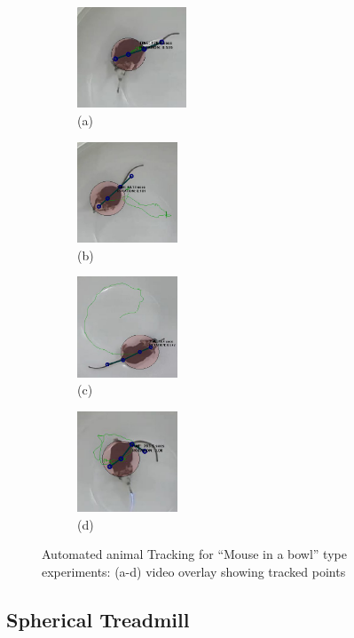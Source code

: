 \begin{figure}[htb]
	\begin{subfigure}[t]{0.24\linewidth}\centering
		\includegraphics[height=3cm]{figures/07mousedata1close.jpg}
		\caption{(a)}
	\end{subfigure}
	\hfill
	\begin{subfigure}[t]{0.24\linewidth}\centering
		\includegraphics[width=3cm]{figures/06mousedata1.jpg}
		\caption{(b)}
	\end{subfigure}
	\begin{subfigure}[t]{0.24\linewidth}\centering
		\includegraphics[width=3cm]{figures/08mousedata2.jpg}
		\caption{(c)}
	\end{subfigure}
	\begin{subfigure}[t]{0.24\linewidth}\centering
		\includegraphics[width=3cm]{figures/09mousedata1fiberon1.jpg}
		\caption{(d)}
	\end{subfigure}
	\caption{
		Automated animal Tracking for ``Mouse in a bowl'' type experiments: (a-d) video overlay showing tracked points} \label{fig:mouse-in-bowl-2}
\end{figure}

\subsection{Spherical Treadmill}\label{sec:spherical-treadmill}

